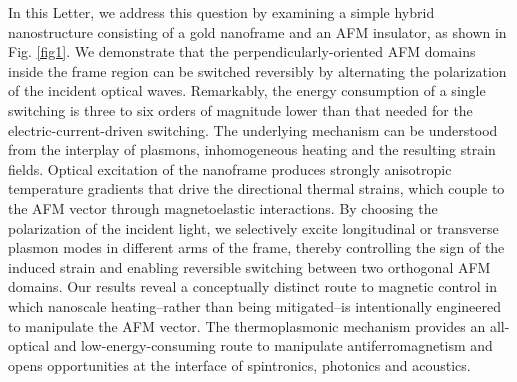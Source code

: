 \documentclass[aps,prl,reprint,floatfix,longbibliography,twocolumn]{revtex4-2}
\begin{document}
In this Letter, we address this question by examining a simple hybrid nanostructure consisting of a gold nanoframe and an AFM insulator, as shown in Fig. \ref{fig1}. We demonstrate that the perpendicularly-oriented AFM domains inside the frame region can be switched reversibly by alternating the polarization of the incident optical waves. Remarkably, the energy consumption of a single switching is three to six orders of magnitude lower than that needed for the electric-current-driven switching. The underlying mechanism can be understood from the interplay of plasmons, inhomogeneous heating and the resulting strain fields. Optical excitation of the nanoframe produces strongly anisotropic temperature gradients that drive the directional thermal strains, which couple to the AFM vector through magnetoelastic interactions. By choosing the polarization of the incident light, we selectively excite longitudinal or transverse plasmon modes in different arms of the frame, thereby controlling the sign of the induced strain and enabling reversible switching between two orthogonal AFM domains. Our results reveal a conceptually distinct route to magnetic control in which nanoscale heating--rather than being mitigated--is intentionally engineered to manipulate the AFM vector.
The thermoplasmonic mechanism provides an all-optical and low-energy-consuming route to manipulate antiferromagnetism and opens opportunities at the interface of spintronics, photonics and acoustics.
\end{document}
